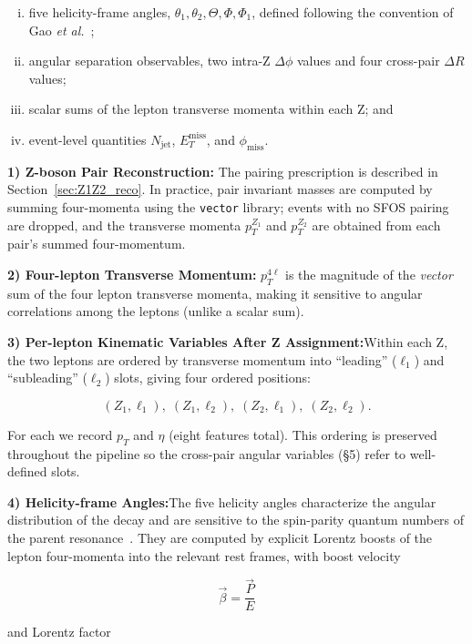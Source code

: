\documentclass[conference]{IEEEtran}
\begin{document}
{\begin{enumerate}[(i)]
    \item five helicity-frame angles,
    $\theta_1, \theta_2, \Theta, \Phi, \Phi_1$,
    defined following the convention of Gao \textit{et al.}~\cite{Gao_2010};
    
    \item angular separation observables, two intra-Z $\Delta\phi$ values and four cross-pair $\Delta R$ values;
    
    \item scalar sums of the lepton transverse momenta within each Z; and
    
    \item event-level quantities
    $N_{\mathrm{jet}}$,
    $E_{T}^{\mathrm{miss}}$,
    and
    $\phi_{\mathrm{miss}}$.
\end{enumerate}


\textbf{1) Z-boson Pair Reconstruction:} The pairing prescription is described in Section~\ref{sec:Z1Z2_reco}. In practice, pair invariant masses are computed by summing four-momenta using the \texttt{vector} library; events with no SFOS pairing are dropped, and the transverse momenta $p_T^{Z_1}$ and $p_T^{Z_2}$ are obtained from each pair's summed four-momentum.

\textbf{2) Four-lepton Transverse Momentum:} $p_T^{4\ell}$ is the magnitude of the \textit{vector} sum of the four lepton transverse momenta, making it sensitive to angular correlations among the leptons (unlike a scalar sum).


\textbf{3) Per-lepton Kinematic Variables After Z Assignment:}Within each Z, the two leptons are ordered by transverse momentum into ``leading'' ($\ell_1$) and ``subleading'' ($\ell_2$) slots, giving four ordered positions:

\[
(Z_1,\ell_1),\;
(Z_1,\ell_2),\;
(Z_2,\ell_1),\;
(Z_2,\ell_2).
\]

For each we record $p_T$ and $\eta$ (eight features total). This ordering is preserved throughout the pipeline so the cross-pair angular variables (\S5) refer to well-defined slots.


\textbf{4) Helicity-frame Angles:}The five helicity angles characterize the angular distribution of the decay and are sensitive to the spin-parity quantum numbers of the parent resonance~\cite{Gao_2010}. They are computed by explicit Lorentz boosts of the lepton four-momenta into the relevant rest frames, with boost velocity

\[
\vec{\beta} = \frac{\vec{P}}{E}
\]

and Lorentz factor

}
\end{document}
